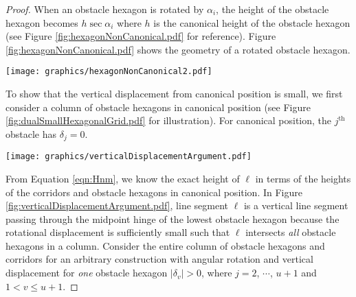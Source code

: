 \documentclass[10pt]{CSUNthesis}
\theoremstyle{plain}%
\theoremstyle{definition}
\theoremstyle{remark}
\newcommand{\jth}{j^\text{th}}
\begin{document}
\begin{proof}
When an obstacle hexagon is rotated by $\alpha_i$, the height of the obstacle hexagon becomes $h \sec \alpha_i$ where $h$ is the canonical height of the obstacle hexagon (see Figure \ref{fig:hexagonNonCanonical.pdf} for reference).
Figure \ref{fig:hexagonNonCanonical.pdf} shows the geometry of a rotated obstacle hexagon.

\begin{minipage}{\linewidth}
\begin{center}
\texttt{[image: graphics/hexagonNonCanonical2.pdf]}
\label{fig:hexagonNonCanonical.pdf}
\end{center}
\end{minipage}

To show that the vertical displacement from canonical position is small, we first consider a column of obstacle hexagons in canonical position (see Figure \ref{fig:dualSmallHexagonalGrid.pdf} for illustration).  
For canonical position, the $\jth$ obstacle has $\delta_j = 0$.

\begin{minipage}{\linewidth}
\begin{center}
\texttt{[image: graphics/verticalDisplacementArgument.pdf]}
\label{fig:verticalDisplacementArgument.pdf}
\end{center}
\end{minipage}

From Equation \ref{eqn:Hnm}, we know the exact height of $\ell$ in terms of the heights of the corridors and obstacle hexagons in canonical position.
In Figure \ref{fig:verticalDisplacementArgument.pdf}, line segment $\ell$ is a vertical line segment passing through  the midpoint hinge of the lowest obstacle hexagon  because the rotational displacement is sufficiently small such that $\ell$ intersects \textit{all} obstacle hexagons in a column.  
Consider the entire column of obstacle hexagons and corridors for an arbitrary construction with angular rotation and vertical displacement for \textit{one} obstacle hexagon $\vert \delta_v \vert > 0$, where $j=2$, $\cdots$, $u+1$ and $1 < v \leq u+1$.


\end{proof}
\end{document}
